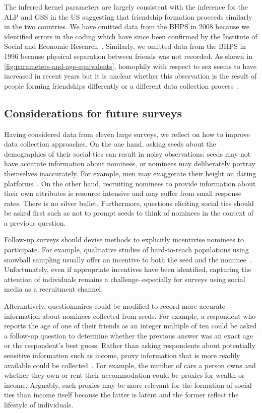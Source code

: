 \documentclass{scrartcl}
\begin{document}
The inferred kernel parameters are largely consistent with the inference for the ALP and GSS in the US suggesting that friendship formation proceeds similarly in the two countries. We have omitted data from the BHPS in 2008 because we identified errors in the coding which have since been confirmed by the Institute of Social and Economic Research~\cite{Hoffmann2016}. Similarly, we omitted data from the BHPS in 1996 because physical separation between friends was not recorded. As shown in \cref{fig:parameters-and-age-equivalents}, homophily with respect to sex seems to have increased in recent years but it is unclear whether this observation is the result of people forming friendships differently or a different data collection process~\cite{Hoffmann2017}.

\subsection{Considerations for future surveys}

Having considered data from eleven large surveys,
we reflect on how to improve data collection approaches. On the one hand, asking seeds about the demographics of their social ties can result in noisy observations: seeds may not have accurate information about nominees, or nominees may deliberately portray themselves inaccurately. For example, men may exaggerate their height on dating platforms~\cite{Bruch2016}. On the other hand, recruiting nominees to provide information about their own attributes is resource intensive and may suffer from small response rates. There is no silver bullet. Furthermore, questions eliciting social ties should be asked first such as not to prompt seeds to think of nominees in the context of a previous question.

Follow-up surveys should devise methods to explicitly incentivise nominees to participate. For example, qualitative studies of hard-to-reach populations using snowball sampling usually offer an incentive to both the seed and the nominee~\cite{Biernacki1981}. Unfortunately, even if appropriate incentives have been identified, capturing the attention of individuals remains a challenge--especially for surveys using social media as a recruitment channel.

Alternatively, questionnaires could be modified to record more accurate information about nominees collected from seeds. For example, a respondent who reports the age of one of their friends as an integer multiple of ten could be asked a follow-up question to determine whether the previous answer was an exact age or the respondent's best guess. Rather than asking respondents about potentially sensitive information such as income, proxy information that is more readily available could be collected~\cite{Po2012}. For example, the number of cars a person owns and whether they own or rent their accommodation could be proxies for wealth or income. Arguably, such proxies may be more relevant for the formation of social ties than income itself because the latter is latent and the former reflect the lifestyle of individuals.
\end{document}
